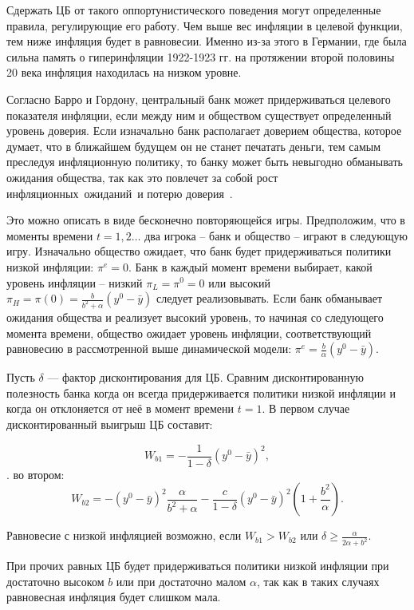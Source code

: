 \documentclass[14pt,a4paper, oneside]{extreport}
\begin{document}
Сдержать ЦБ от такого оппортунистического поведения могут определенные правила, регулирующие его работу. Чем выше вес инфляции в целевой функции, тем ниже инфляция будет в равновесии. Именно из-за этого в Германии, где была сильна память о гиперинфляции 1922-1923 гг. на протяжении второй половины 20 века инфляция находилась на низком уровне.

Согласно Барро и Гордону, центральный банк может придерживаться целевого показателя инфляции, если между ним и обществом существует определенный уровень доверия. Если изначально банк располагает доверием общества, которое думает, что в ближайшем будущем он не станет печатать деньги, тем самым преследуя инфляционную политику, то банку может быть невыгодно обманывать ожидания общества, так как это повлечет за собой рост инфляционных~ожиданий~и потерю доверия~\cite{barro1981positive}. 

Это можно описать в виде бесконечно повторяющейся игры. Предположим, что в моменты времени $ t=1,2…$  два игрока – банк и общество – играют в следующую игру. Изначально общество ожидает, что банк будет придерживаться политики низкой инфляции: $\pi^e=0$. Банк в каждый момент времени выбирает, какой уровень инфляции – низкий $\pi_L=\pi^0=0$ или высокий $\pi_H=\pi(0)=\frac{b}{b^2+\alpha} (y^0 - \bar y)$  следует реализовывать. Если банк обманывает ожидания общества и реализует высокий уровень, то начиная со следующего момента времени, общество ожидает уровень инфляции, соответствующий равновесию в рассмотренной выше динамической модели: $\pi^e=\frac{b}{\alpha} (y^0- \bar y)$.

Пусть $\delta$ --- фактор дисконтирования для ЦБ. Сравним дисконтированную полезность банка когда он всегда придерживается политики низкой инфляции и когда он  отклоняется от неё в момент времени $t=1$. В первом случае дисконтированный выигрыш ЦБ составит:

\begin{equation}\label{T3-7}
W_{b1} =  -\frac{1}{1-\delta}(y^0-\bar y)^2,
\end{equation}.
во втором:
\begin{equation}\label{T3-8}
W_{b2} =  -(y^0-\bar y)^2 \frac{\alpha}{b^2+\alpha}-\frac{c}{1-\delta}(y^0 - \bar y)^2(1+\frac{b^2}{\alpha}).
\end{equation}

Равновесие с низкой инфляцией возможно, если $W_{b1}>W_{b2}$ или $\delta \ge \frac{\alpha}{2\alpha+b^2}$.

При прочих равных ЦБ будет придерживаться политики низкой инфляции при достаточно высоком $b$ или при достаточно малом $\alpha$, так как в таких случаях равновесная инфляция будет слишком мала.
\end{document}

